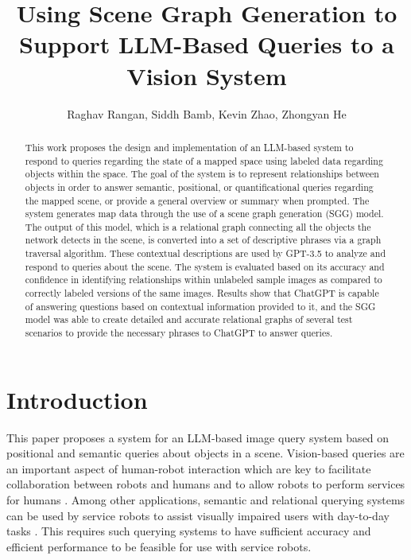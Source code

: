 \documentclass[letterpaper, 10 pt, conference]{ieeeconf}  %
\title{\LARGE \bf
Using Scene Graph Generation to Support LLM-Based Queries to a Vision System}
\author{Raghav Rangan, Siddh Bamb, Kevin Zhao, Zhongyan He%
}
\begin{document}
\maketitle
\thispagestyle{empty}
\pagestyle{empty}


\begin{abstract}
    This work proposes the design and implementation of an LLM-based system to respond to queries regarding the state of a mapped space using labeled data regarding objects within the space. The goal of the system is to represent relationships between objects in order to answer semantic, positional, or quantificational queries regarding the mapped scene, or provide a general overview or summary when prompted. The system generates map data through the use of a scene graph generation (SGG) model. The output of this model, which is a relational graph connecting all the objects the network detects in the scene, is converted into a set of descriptive phrases via a graph traversal algorithm. These contextual descriptions are used by GPT-3.5 to analyze and respond to queries about the scene. The system is evaluated based on its accuracy and confidence in identifying relationships within unlabeled sample images as compared to correctly labeled versions of the same images. Results show that ChatGPT is capable of answering questions based on contextual information provided to it, and the SGG model was able to create detailed and accurate relational graphs of several test scenarios to provide the necessary phrases to ChatGPT to answer queries.
\end{abstract}
    
\section{Introduction}
    This paper proposes a system for an LLM-based image query system based on positional and semantic queries about objects in a scene. Vision-based queries are an important aspect of human-robot interaction which are key to facilitate collaboration between robots and humans and to allow robots to perform services for humans \cite{robinson2023vision}. Among other applications, semantic and relational querying systems can be used by service robots to assist visually impaired users with day-to-day tasks \cite{azenkot2016enabling}. This requires such querying systems to have sufficient accuracy and efficient performance to be feasible for use with service robots.
\end{document}
